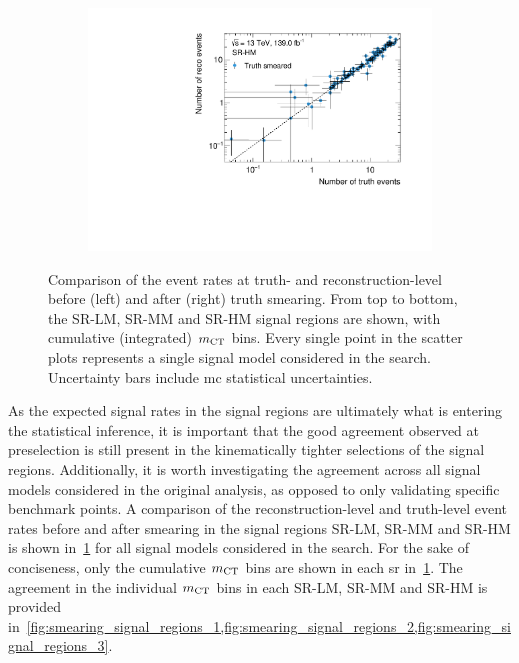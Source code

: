 \begin{figure}
\begin{subfigure}[b]{0.49\linewidth}
	\end{subfigure}\hfill
	\begin{subfigure}[b]{0.49\linewidth}
		\centering\includegraphics[width=\textwidth]{yields_SR-HM_smeared}
	\end{subfigure}
	\caption{Comparison of the event rates at truth- and reconstruction-level before (left) and after (right) truth smearing. From top to bottom, the SR-LM, SR-MM and SR-HM signal regions are shown, with cumulative (integrated) $m_{\textrm{CT}}$ bins. Every single point in the scatter plots represents a single signal model considered in the \onelepton search. Uncertainty bars include \gls{mc} statistical uncertainties.}
	\label{fig:smearing_signal_regions}
\end{figure}
 
 As the expected signal rates in the signal regions are ultimately what is entering the statistical inference, it is important that the good agreement observed at preselection is still present in the kinematically tighter selections of the signal regions. Additionally, it is worth investigating the agreement across all signal models considered in the original analysis, as opposed to only validating specific benchmark points. A comparison of the reconstruction-level and truth-level event rates before and after smearing in the signal regions SR-LM, SR-MM and SR-HM is shown in~\cref{fig:smearing_signal_regions} for all signal models considered in the \onelepton search. For the sake of conciseness, only the cumulative $m_{\textrm{CT}}$ bins are shown in each \gls{sr} in~\cref{fig:smearing_signal_regions}. The agreement in the individual $m_{\textrm{CT}}$ bins in each SR-LM, SR-MM and SR-HM is provided in~\cref{fig:smearing_signal_regions_1,fig:smearing_signal_regions_2,fig:smearing_signal_regions_3}.
 
